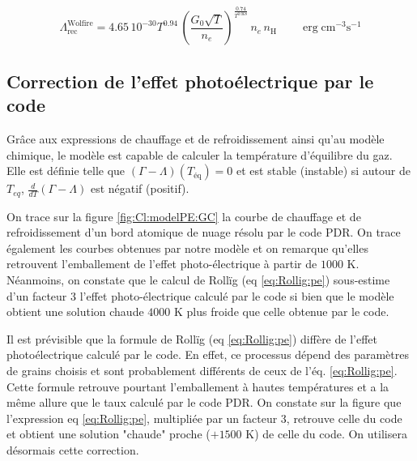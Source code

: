 \begin{equation}
    \Lambda_{\mathrm{rec}}^{\mathrm{Wolfire}} = 4.65\,10^{-30} T^{0.94} \, (\frac{G_0 \sqrt{T}}{n_e})^{\frac{0.74}{T^{0.068}}} \, n_e \, n_\mathrm{H} \qquad \operatorname{erg} \mathrm{cm}^{-3} \mathrm{s}^{-1}
\end{equation}


\subsection{Correction de l'effet photoélectrique par le code}

Grâce aux expressions de chauffage et de refroidissement ainsi qu'au modèle chimique, le modèle est capable de calculer la température d'équilibre du gaz. Elle est définie telle que $(\Gamma - \Lambda)(T_{\mathrm{éq}})  = 0$ et est stable (instable) si autour de $T_{eq}$, $\frac{d}{dT}(\Gamma - \Lambda)$ est négatif (positif). \newline 

On trace sur la figure \ref{fig:Cl:modelPE:GC} la courbe de chauffage et de refroidissement d'un bord atomique de nuage résolu par le code PDR. On trace également les courbes obtenues par notre modèle et on remarque qu'elles retrouvent l'emballement de l'effet photo-électrique à partir de $1000$ K. Néanmoins, on constate que le calcul de Rollïg (eq \ref{eq:Rollig:pe}) sous-estime d'un facteur 3 l'effet photo-électrique calculé par le code si bien que le modèle obtient une solution \og chaude \fg{} $4000$ K plus froide que celle obtenue par le code. \newline 

Il est prévisible que la formule de Rollïg (eq \ref{eq:Rollig:pe}) diffère de l'effet photoélectrique calculé par le code. En effet, ce processus dépend des paramètres de grains choisis et sont probablement différents de ceux de l'éq. \ref{eq:Rollig:pe}. Cette formule retrouve pourtant l'emballement à hautes températures et a la même allure que le taux calculé par le code PDR. On constate sur la figure \label{fig:Cl:modelPE:GC3} que l'expression eq \ref{eq:Rollig:pe}, multipliée par un facteur 3, retrouve celle du code et obtient une solution "chaude" proche ($+1500$ K) de celle du code. On utilisera désormais cette correction. 


